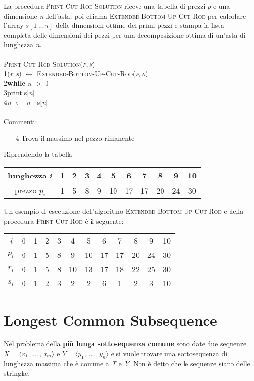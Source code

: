 \documentclass[10pt, a4paper]{report}
\newcommand\firsttab[1][0.5cm]{\hspace*{#1}}
\newcommand\secondtab[1][1cm]{\hspace*{#1}}
\begin{document}
La procedura \textsc{Print-Cut-Rod-Solution} riceve una tabella di prezzi \textit{p} e una dimensione \textit{n} dell'asta; poi chiama \textsc{Extended-Bottom-Up-Cut-Rod} per calcolare l'array $s[1\,...\,n]$ delle dimensioni ottime dei primi pezzi e stampa la lista completa delle dimensioni dei pezzi per una decomposizione ottima di un'asta di lunghezza \textit{n}.\\\\
\textsc{Print-Cut-Rod-Solution(\textit{p},\,\textit{n})}\\
1\firsttab(\textit{r},\,\textit{s}) $\leftarrow$ \textsc{Extended-Bottom-Up-Cut-Rod(\textit{p},\,\textit{n})}\\
2\firsttab\textbf{while} \textit{n} $>$ 0\\
3\secondtab print s[\textit{n}]\\
4\secondtab\textit{n} $\leftarrow$ \textit{n} - s[\textit{n}]\\\\
Commenti:
\begin{enumerate}
\item[4]Trova il massimo nel pezzo rimanente
\end{enumerate}
Riprendendo la tabella
\begin{center}
\begin{tabular}{c | cccccccccc}
lunghezza \textit{i} &1 &2 &3 &4 &5 &6 &7 &8 &9 &10\\
\hline
prezzo $p_i$ &1 &5 &8 &9 &10 &17 &17 &20 &24 &30
\end{tabular}
\end{center}
Un esempio di esecuzione dell'algoritmo \textsc{Extended-Bottom-Up-Cut-Rod} e  della procedura \textsc{Print-Cut-Rod} è il seguente:
\begin{center}
\begin{tabular}{c | ccccccccccc}
\textit{i} &0 &1 &2 &3 &4 &5 &6 &7 &8 &9 &10\\
$p_i$ &0 &1 &5 &8 &9 &10 &17 &17 &20 &24 &30\\
$r_i$ &0 &1 &5 &8 &10 &13 &17 &18 &22 &25 &30\\
$s_i$ &0 &1 &2 &3 &2 &2 &6 &1 &2 &3 &10
\end{tabular}
\end{center}
\section{Longest Common Subsequence}
Nel problema della \textbf{più lunga sottosequenza comune} sono date due sequenze $X = \langle x_1,\,...\,,\,x_m \rangle$ e $Y = \langle y_1,\,...\,,\,y_n\rangle$ e si vuole trovare una sottosequenza di lunghezza massima che è comune a \textit{X} e \textit{Y}. Non è detto che le sequenze siano delle stringhe.
\end{document}
